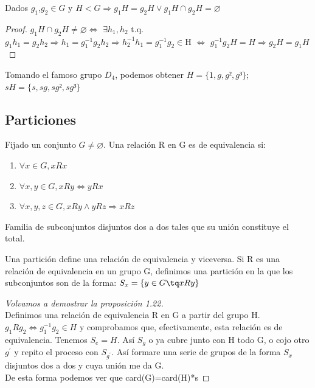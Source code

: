 \documentclass[a4paper,10pt]{apuntes}
\begin{document}
  \begin{prop}
   Dados $g_{1}$,$g_{2}\in G$ y $H<G\Rightarrow g_{1}H=g_{2}H \vee g_{1}H\cap g_{2}H=\varnothing$
  \end{prop}
  \begin{proof}
   $g_{1}H\cap g_{2}H \neq \varnothing \Leftrightarrow$ $\exists h_{1},h_{2}$  t.q. $g_{1}h_{1}=g_{2}h_{2} \Rightarrow h_{1}=g_{1}^{-1}g_{2}h_{2} \Rightarrow h_{2}^{-1}h_{1}=g_{1}^{-1}g_{2}\in$H
   $\Leftrightarrow$ $g_{1}^{-1}g_{2}H=H \Rightarrow g_{2}H=g_{1}H$
  \end{proof}
  \begin{example}
   Tomando el famoso grupo $D_{4}$, podemos obtener $H=\{1,g,g²,g³\}$; $sH=\{s,sg,sg²,sg³\}$
  \end{example}
  \subsection{Particiones}
  \begin{defn}
   Fijado un conjunto $G\neq\varnothing$. Una relación R en G es de equivalencia si:
   \begin{enumerate}
    \item $\forall x\in G,  xRx$
    \item $\forall x,y \in G,  xRy \Leftrightarrow  yRx$
    \item $\forall x,y,z \in G,  xRy \wedge yRz \Rightarrow xRz$
   \end{enumerate}
  \end{defn}
  \begin{defn}[Partición]
   Familia de subconjuntos disjuntos dos a dos tales que su unión constituye el total.
  \end{defn}
  
  Una partición define una relación de equivalencia y viceversa. Si R es una relación de equivalencia en un grupo G, 
  definimos una partición en la que los subconjuntos son de la forma: $S_{x}=\{y\in G \tq xRy\}$
  
  \begin{proof}[Volvamos a demostrar la proposición 1.22]
   \\Definimos una relación de equivalencia R en G a partir del grupo H.
   $g_{1}Rg_{2} \Leftrightarrow g_{1}^{-1}g_{2}\in H$  y comprobamos que, efectivamente, esta relación es de equivalencia.
   Tenemos $S_{e}=H$. Así $S_{g}$  o ya cubre junto con H todo G, o cojo otro $g^{'}$  y repito el proceso con $S_{g^{'}}$.
   Así formare una serie de grupos de la forma $S_{x}$  disjuntos dos a dos y cuya unión me da G.\\
   De esta forma podemos ver que card(G)=card(H)*s
  \end{proof}
  
\end{document}
